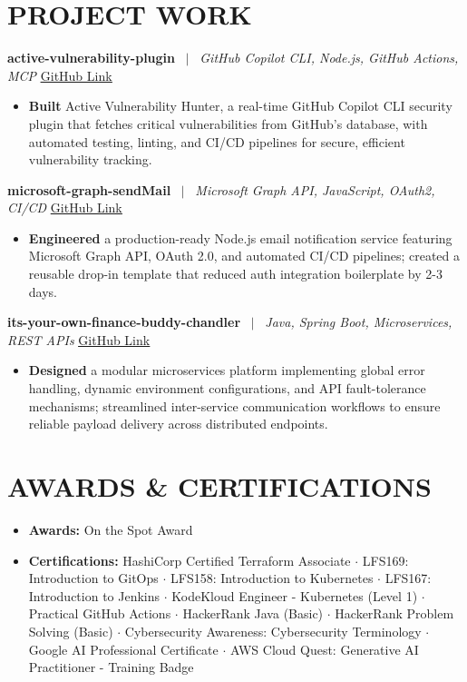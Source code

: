 \documentclass[10pt,a4paper]{article}
\begin{document}
\section*{PROJECT WORK}
\noindent \textbf{active-vulnerability-plugin} \ $|$ \ \textit{GitHub Copilot CLI, Node.js, GitHub Actions, MCP} \hfill \href{https://github.com/Arshdeepdubey/active-vulnerability-plugin}{\underline{GitHub Link}}
\begin{itemize}
\item \textbf{Built} Active Vulnerability Hunter, a real-time GitHub Copilot CLI security plugin that fetches critical vulnerabilities from GitHub's database, with automated testing, linting, and CI/CD pipelines for secure, efficient vulnerability tracking.
\end{itemize}
\vspace{2pt}
\noindent \textbf{microsoft-graph-sendMail} \ $|$ \ \textit{Microsoft Graph API, JavaScript, OAuth2, CI/CD} \hfill \href{https://github.com/Arshdeepdubey/microsoft-graph-sendMail}{\underline{GitHub Link}}
\begin{itemize}
\item \textbf{Engineered} a production-ready Node.js email notification service featuring Microsoft Graph API, OAuth 2.0, and automated CI/CD pipelines; created a reusable drop-in template that reduced auth integration boilerplate by 2-3 days.
\end{itemize}
\vspace{2pt}
\noindent \textbf{its-your-own-finance-buddy-chandler} \ $|$ \ \textit{Java, Spring Boot, Microservices, REST APIs} \hfill \href{https://github.com/Arshdeepdubey/its-your-own-finance-buddy-chandler}{\underline{GitHub Link}}
\begin{itemize}
\item \textbf{Designed} a modular microservices platform implementing global error handling, dynamic environment configurations, and API fault-tolerance mechanisms; streamlined inter-service communication workflows to ensure reliable payload delivery across distributed endpoints.
\end{itemize}

\section*{AWARDS \& CERTIFICATIONS}
\begin{itemize}[leftmargin=0pt, label={}, itemsep=2pt, parsep=0pt]
\item \textbf{Awards:} On the Spot Award
\item \textbf{Certifications:} HashiCorp Certified Terraform Associate $\cdot$ LFS169: Introduction to GitOps $\cdot$ LFS158: Introduction to Kubernetes $\cdot$ LFS167: Introduction to Jenkins $\cdot$ KodeKloud Engineer - Kubernetes (Level 1) $\cdot$ Practical GitHub Actions $\cdot$ HackerRank Java (Basic) $\cdot$ HackerRank Problem Solving (Basic) $\cdot$ Cybersecurity Awareness: Cybersecurity Terminology $\cdot$ Google AI Professional Certificate $\cdot$ AWS Cloud Quest: Generative AI Practitioner - Training Badge
\end{itemize}
\end{document}
